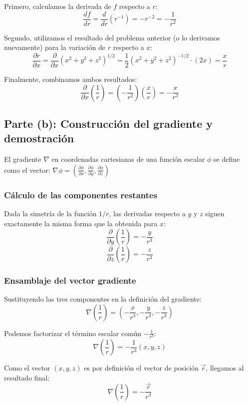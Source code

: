 \documentclass[a4paper]{article}
\begin{document}
Primero, calculamos la derivada de $f$ respecto a $r$:
$$ \frac{df}{dr} = \frac{d}{dr} (r^{-1}) = -r^{-2} = -\frac{1}{r^2} $$

Segundo, utilizamos el resultado del problema anterior (o lo derivamos nuevamente) para la variación de $r$ respecto a $x$:
$$ \frac{\partial r}{\partial x} = \frac{\partial}{\partial x} (x^2 + y^2 + z^2)^{1/2} = \frac{1}{2}(x^2 + y^2 + z^2)^{-1/2} \cdot (2x) = \frac{x}{r} $$

Finalmente, combinamos ambos resultados:
$$ \frac{\partial}{\partial x} \left( \frac{1}{r} \right) = \left( -\frac{1}{r^2} \right) \left( \frac{x}{r} \right) = -\frac{x}{r^3} $$

\subsection{Parte (b): Construcción del gradiente y demostración}

El gradiente $\nabla$ en coordenadas cartesianas de una función escalar $\phi$ se define como el vector:
$ \nabla \phi = \left( \frac{\partial \phi}{\partial x}, \frac{\partial \phi}{\partial y}, \frac{\partial \phi}{\partial z} \right) $

\subsubsection{Cálculo de las componentes restantes}

Dada la simetría de la función $1/r$, las derivadas respecto a $y$ y $z$ siguen exactamente la misma forma que la obtenida para $x$:
$$ \frac{\partial}{\partial y} \left( \frac{1}{r} \right) = -\frac{y}{r^3} $$
$$ \frac{\partial}{\partial z} \left( \frac{1}{r} \right) = -\frac{z}{r^3} $$

\subsubsection{Ensamblaje del vector gradiente}

Sustituyendo las tres componentes en la definición del gradiente:
$$ \nabla \left( \frac{1}{r} \right) = \left( -\frac{x}{r^3}, -\frac{y}{r^3}, -\frac{z}{r^3} \right) $$

Podemos factorizar el término escalar común $-\frac{1}{r^3}$:
$$ \nabla \left( \frac{1}{r} \right) = -\frac{1}{r^3} (x, y, z) $$

Como el vector $(x, y, z)$ es por definición el vector de posición $\vec{r}$, llegamos al resultado final:
$$ \nabla \left( \frac{1}{r} \right) = -\frac{\vec{r}}{r^3} $$
\end{document}
